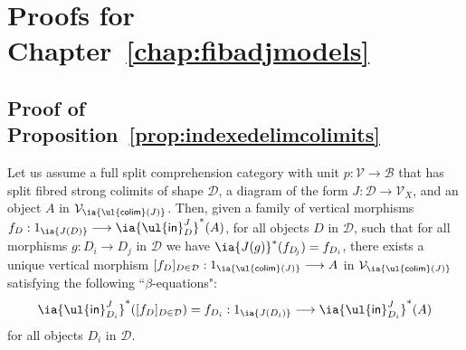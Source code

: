 
\chapter{Proofs for Chapter~\ref{chap:fibadjmodels}}
\label{chap:appendixC4}


\section{Proof of Proposition~\ref{prop:indexedelimcolimits}}
\label{sect:proofofprop:indexedelimcolimits}

{
\renewcommand{\thetheorem}{\ref{prop:indexedelimcolimits}}
\begin{proposition}
Let us assume a full split comprehension category with unit \linebreak $p : \mathcal{V} \longrightarrow \mathcal{B}$ that has split fibred strong colimits of shape $\mathcal{D}$, a diagram of the form \linebreak $J : \mathcal{D} \longrightarrow \mathcal{V}_X$, and an object $A$ in $\mathcal{V}_{\ia {\mathsf{\ul{colim}}(J)}}$. Then, given a family of vertical morphisms $f_{D} : 1_{\ia {J(D)}} \longrightarrow \ia {\mathsf{\ul{in}}^{J}_D} ^*(A)$, for all objects $D$ in $\mathcal{D}$, such that for all morphisms \linebreak$g : D_i \longrightarrow D_{\!j}$ in $\mathcal{D}$ we have $\ia {J(g)} ^*(f_{D_{\!j}}) = f_{D_i}$, there exists a unique vertical morphism $[f_D]_{D \in \mathcal{D}} : 1_{\ia {\mathsf{\ul{colim}}(J)}} \longrightarrow A$ in $\mathcal{V}_{\ia {\mathsf{\ul{colim}}(J)}}$ satisfying the following ``$\beta$-equations":
\[
\ia {\mathsf{\ul{in}}^{J}_{D_i}}^*([f_D]_{D \in \mathcal{D}}) = f_{D_i}  : 1_{\ia {J(D_i)}} \longrightarrow \ia {\mathsf{\ul{in}}^{J}_{D_i}} ^*(A)
\]
for all objects $D_i$ in $\mathcal{D}$.
\end{proposition}
\addtocounter{theorem}{-1}
}

